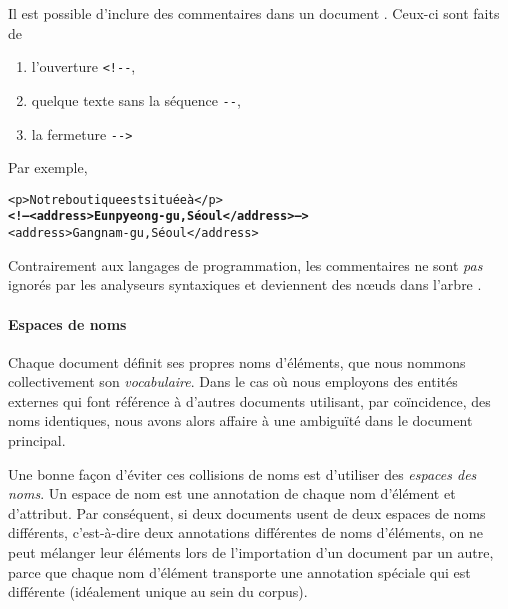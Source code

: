 Il est possible d'inclure des commentaires dans un document
\XML. Ceux-ci sont faits de
\begin{enumerate}

  \item l'ouverture \verb|<!--|,

  \item quelque texte sans la séquence \verb|--|,

  \item la fermeture \verb|-->|

\end{enumerate}
Par exemple,
\begin{alltt}
\small<p>Notre boutique est située à</p>
\textbf{<!-- <address>Eunpyeong-gu, Séoul</address> -->}
<address>Gangnam-gu, Séoul</address>
\end{alltt}
Contrairement aux langages de programmation, les commentaires ne sont
\emph{pas} ignorés par les analyseurs syntaxiques et deviennent des
nœuds dans l'arbre \XML.


\paragraph{Espaces de noms}

Chaque document \XML définit ses propres noms d'éléments, que nous
nommons collectivement son \emph{vocabulaire}. Dans le cas où nous
employons des entités externes qui font référence à d'autres documents
\XML utilisant, par coïncidence, des noms identiques, nous avons alors
affaire à une ambiguïté dans le document principal.

Une bonne façon d'éviter ces collisions de noms est d'utiliser des
\emph{espaces des noms}. Un espace de nom est une annotation de chaque
nom d'élément et d'attribut. Par conséquent, si deux documents \XML
usent de deux espaces de noms différents, c'est-à-dire deux
annotations différentes de noms d'éléments, on ne peut mélanger leur
éléments lors de l'importation d'un document par un autre, parce que
chaque nom d'élément transporte une annotation spéciale qui est
différente (idéalement unique au sein du corpus).

